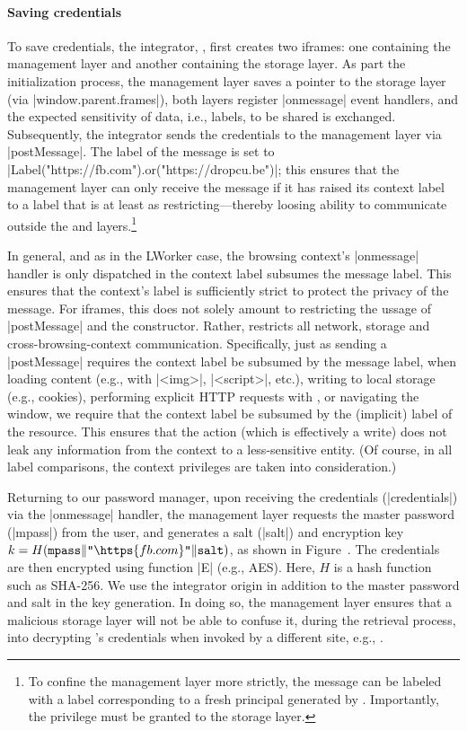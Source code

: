 \paragraph{Saving credentials}
%
To save credentials, the integrator, , first creates two
iframes: one containing the  management layer and
another containing the  storage layer.
%
As part the initialization process, the management layer saves a
pointer to the storage layer (via \js|window.parent.frames|), both
layers register \js|onmessage| event handlers, and the expected
sensitivity of data, i.e., labels, to be shared is exchanged.
%
Subsequently, the integrator sends the credentials to the management
layer via \js|postMessage|.
%
The label of the message is set to
\js|Label("https://fb.com").or("https://dropcu.be")|; this ensures
that the management layer can only receive the message if it has
raised its context label to a label that is at least as
restricting---thereby loosing ability to communicate outside the
 and  layers.\footnote{
  To confine the management layer more strictly, the message can be
  labeled with a label corresponding to a fresh principal generated by
  . Importantly, the privilege must be granted to the
  storage layer.
}

In general, and as in the LWorker case, the browsing context's
\js|onmessage| handler is only dispatched in the context label
subsumes the message label.
%
This ensures that the context's label is sufficiently strict to
protect the privacy of the message.
%
For iframes, this does not solely amount to restricting the ussage of
\js|postMessage| and the \xhr{} constructor.
%
Rather, \sys{} restricts all network, storage and
cross-browsing-context communication.
%
Specifically, just as sending a \js|postMessage| requires the context
label be subsumed by the message label, when loading content (e.g.,
with \js|<img>|, \js|<script>|, etc.), writing to local storage
(e.g., cookies), performing explicit HTTP requests with \xhr{}, or
navigating the window, we require that the context label be subsumed
by the (implicit) label of the resource.
%
This ensures that the action (which is effectively a write) does not
leak any information from the context to a less-sensitive entity.
%
(Of course, in all label comparisons, the context privileges are taken
into consideration.)
%
 
Returning to our password manager, upon receiving the credentials
(\js|credentials|) via the \js|onmessage| handler, the management
layer requests the master password (\js|mpass|) from the user, and
generates a salt (\js|salt|) and encryption key $k =
H(\texttt{mpass}\|\texttt{"}\https{fb.com}\texttt{"}\|\texttt{salt})$,
as shown in Figure~.
%
The credentials are then encrypted using function \js|E| (e.g., AES).
% 
Here, $H$ is a hash function such as SHA-256.
%
We use the integrator origin in addition to the master
password and salt in the key generation.
%
In doing so, the management layer ensures that a malicious storage
layer will not be able to confuse it, during the retrieval process,
into decrypting 's credentials when invoked by a
different site, e.g., .

